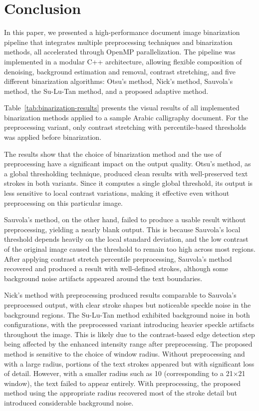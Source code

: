 \section{Conclusion}

In this paper, we presented a high-performance document image binarization pipeline that integrates multiple preprocessing techniques and binarization methods, all accelerated through OpenMP parallelization. The pipeline was implemented in a modular C++ architecture, allowing flexible composition of denoising, background estimation and removal, contrast stretching, and five different binarization algorithms: Otsu's method, Nick's method, Sauvola's method, the Su-Lu-Tan method, and a proposed adaptive method.

Table~\ref{tab:binarization-results} presents the visual results of all implemented binarization methods applied to a sample Arabic calligraphy document. For the preprocessing variant, only contrast stretching with percentile-based thresholds was applied before binarization.

The results show that the choice of binarization method and the use of preprocessing have a significant impact on the output quality. Otsu's method, as a global thresholding technique, produced clean results with well-preserved text strokes in both variants. Since it computes a single global threshold, its output is less sensitive to local contrast variations, making it effective even without preprocessing on this particular image.

Sauvola's method, on the other hand, failed to produce a usable result without preprocessing, yielding a nearly blank output. This is because Sauvola's local threshold depends heavily on the local standard deviation, and the low contrast of the original image caused the threshold to remain too high across most regions. After applying contrast stretch percentile preprocessing, Sauvola's method recovered and produced a result with well-defined strokes, although some background noise artifacts appeared around the text boundaries.

Nick's method with preprocessing produced results comparable to Sauvola's preprocessed output, with clear stroke shapes but noticeable speckle noise in the background regions. The Su-Lu-Tan method exhibited background noise in both configurations, with the preprocessed variant introducing heavier speckle artifacts throughout the image. This is likely due to the contrast-based edge detection step being affected by the enhanced intensity range after preprocessing. The proposed method is sensitive to the choice of window radius. Without preprocessing and with a large radius, portions of the text strokes appeared but with significant loss of detail. However, with a smaller radius such as 10 (corresponding to a 21$\times$21 window), the text failed to appear entirely. With preprocessing, the proposed method using the appropriate radius recovered most of the stroke detail but introduced considerable background noise.


